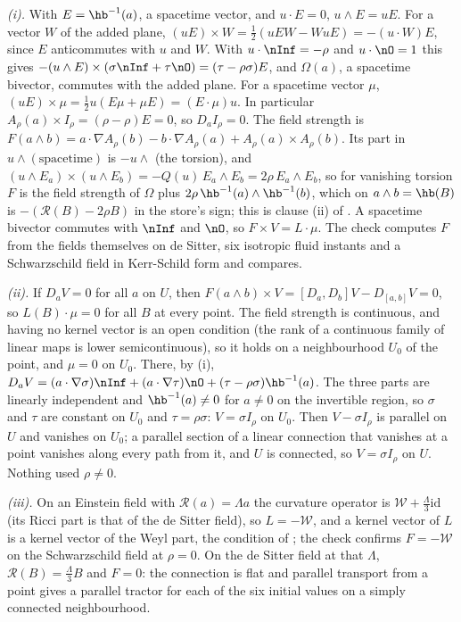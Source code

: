 \emph{(i).} With $E = \hb^{-1}(a)$, a spacetime vector, and $u\cdot E = 0$, $u\wedge E = uE$. For a vector $W$ of the added plane, $(uE)\times W = \tfrac12(uEW - WuE) = -(u\cdot W)E$, since $E$ anticommutes with $u$ and $W$. With $u\cdot\nInf = -\rho$ and $u\cdot\nO = 1$ this gives $-(u\wedge E)\times(\sigma\nInf + \tau\nO) = (\tau - \rho\sigma)E$, and $\Omega(a)$, a spacetime bivector, commutes with the added plane. For a spacetime vector $\mu$, $(uE)\times\mu = \tfrac12 u(E\mu + \mu E) = (E\cdot\mu)u$. In particular $A_{\rho}(a)\times I_{\rho} = (\rho - \rho)E = 0$, so $D_{a}I_{\rho} = 0$. The field strength is $F(a\wedge b) = a\cdot\nabla A_{\rho}(b) - b\cdot\nabla A_{\rho}(a) + A_{\rho}(a)\times A_{\rho}(b)$. Its part in $u\wedge(\text{spacetime})$ is $-u\wedge$ (the torsion), and $(u\wedge E_{a})\times(u\wedge E_{b}) = -Q(u)\,E_{a}\wedge E_{b} = 2\rho\,E_{a}\wedge E_{b}$, so for vanishing torsion $F$ is the field strength of $\Omega$ plus $2\rho\,\hb^{-1}(a)\wedge\hb^{-1}(b)$, which on $a\wedge b = \hb(B)$ is $-(\mathcal{R}(B) - 2\rho B)$ in the store's sign; this is clause (ii) of . A spacetime bivector commutes with $\nInf$ and $\nO$, so $F\times V = L\cdot\mu$. The check computes $F$ from the fields themselves on de Sitter, six isotropic fluid instants and a Schwarzschild field in Kerr-Schild form and compares.

\emph{(ii).} If $D_{a}V = 0$ for all $a$ on $U$, then $F(a\wedge b)\times V = [D_{a}, D_{b}]V - D_{[a,b]}V = 0$, so $L(B)\cdot\mu = 0$ for all $B$ at every point. The field strength is continuous, and having no kernel vector is an open condition (the rank of a continuous family of linear maps is lower semicontinuous), so it holds on a neighbourhood $U_{0}$ of the point, and $\mu = 0$ on $U_{0}$. There, by (i), $D_{a}V = (a\cdot\nabla\sigma)\nInf + (a\cdot\nabla\tau)\nO + (\tau - \rho\sigma)\hb^{-1}(a)$. The three parts are linearly independent and $\hb^{-1}(a) \neq 0$ for $a \neq 0$ on the invertible region, so $\sigma$ and $\tau$ are constant on $U_{0}$ and $\tau = \rho\sigma$: $V = \sigma I_{\rho}$ on $U_{0}$. Then $V - \sigma I_{\rho}$ is parallel on $U$ and vanishes on $U_{0}$; a parallel section of a linear connection that vanishes at a point vanishes along every path from it, and $U$ is connected, so $V = \sigma I_{\rho}$ on $U$. Nothing used $\rho \neq 0$.

\emph{(iii).} On an Einstein field with $\mathcal{R}(a) = \Lambda a$ the curvature operator is $\mathcal{W} + \tfrac{\Lambda}{3}\mathrm{id}$ (its Ricci part is that of the de Sitter field), so $L = -\mathcal{W}$, and a kernel vector of $L$ is a kernel vector of the Weyl part, the condition of ; the check confirms $F = -\mathcal{W}$ on the Schwarzschild field at $\rho = 0$. On the de Sitter field at that $\Lambda$, $\mathcal{R}(B) = \tfrac{\Lambda}{3}B$ and $F = 0$: the connection is flat and parallel transport from a point gives a parallel tractor for each of the six initial values on a simply connected neighbourhood.


